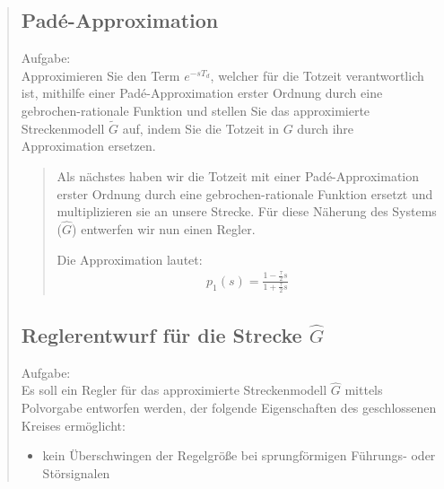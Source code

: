 \begin{quote}
\begin{quote}
    \end{quote}
    
    
    \subsection{Pad\'e-Approximation}
    
    Aufgabe:\\
    Approximieren Sie den Term $e^{-sT_d}$, welcher für die Totzeit verantwortlich ist, mithilfe einer
    Pad\'e-Approximation erster Ordnung durch eine gebrochen-rationale Funktion und stellen Sie das approximierte
    Streckenmodell $\tilde{G}$ auf, indem Sie die Totzeit in $G$ durch ihre Approximation ersetzen. \vspace{1em}
    
    \begin{quote}
        
        Als nächstes haben wir die Totzeit mit einer Pad\'e-Approximation erster Ordnung durch eine gebrochen-rationale
        Funktion ersetzt und multiplizieren sie an unsere Strecke. Für diese Näherung des Systems ($\hat{G}$) entwerfen
        wir nun einen Regler.\vspace{1em}
        
        Die Approximation lautet:
        \begin{equation*}
        	\begin{split}
        		p_1(s) = \frac{1-\frac{\tau}{2}s}{1+\frac{\tau}{2}s}
        	\end{split}
        \end{equation*}
        
    \end{quote}
    
    \subsection{Reglerentwurf für die Strecke $\hat{G}$}
    Aufgabe:\\
    Es soll ein Regler für das approximierte Streckenmodell $\hat{G}$ mittels Polvorgabe entworfen werden, der
    folgende Eigenschaften des geschlossenen Kreises ermöglicht:
        
        
        \begin{itemize}
            
            \item kein Überschwingen der Regelgröße bei sprungförmigen Führungs- oder Störsignalen
            

\end{itemize}
\end{quote}
